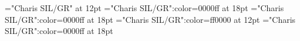 \documentclass[a4paper]{article}
\begin{document}
\pagestyle{plain}
\sloppy
\setlength{\parfillskip}{0pt plus 1fil}
\font\main="Charis SIL/GR" at 12pt
\font\bamain="Charis SIL/GR":color=0000ff at 18pt
\font\amain="Charis SIL/GR":color=0000ff at 18pt
\font\bmain="Charis SIL/GR":color=ff0000 at 12pt
\font\aenmain="Charis SIL/GR":color=0000ff at 18pt

\mbox{} 
\newpage 
\newpage 
\setcounter{page}{1} 
\pagestyle{fancy} 






\end{document}
